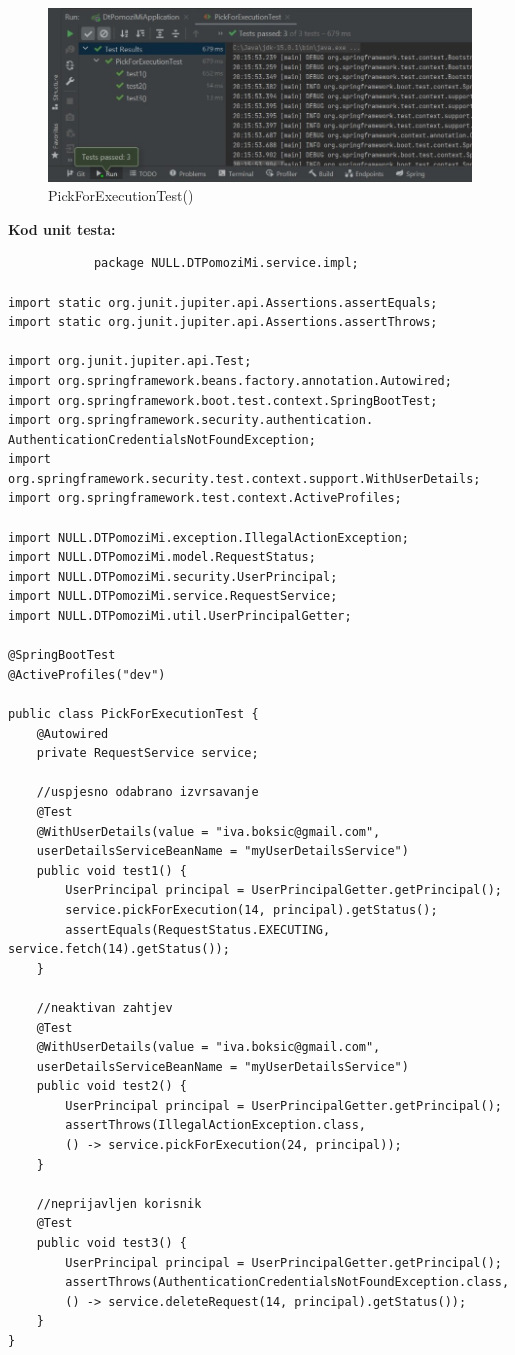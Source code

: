             \begin{figure}[H]
                 \includegraphics[width=\textwidth, height=\textheight, keepaspectratio]{slike/PickForExecutionTest.jpeg}
                \centering
                \caption{PickForExecutionTest()}
            \end{figure}
            
            \noindent \textbf{Kod unit testa: }
            \begin{verbatim}
			package NULL.DTPomoziMi.service.impl;

import static org.junit.jupiter.api.Assertions.assertEquals;
import static org.junit.jupiter.api.Assertions.assertThrows;

import org.junit.jupiter.api.Test;
import org.springframework.beans.factory.annotation.Autowired;
import org.springframework.boot.test.context.SpringBootTest;
import org.springframework.security.authentication.
AuthenticationCredentialsNotFoundException;
import org.springframework.security.test.context.support.WithUserDetails;
import org.springframework.test.context.ActiveProfiles;

import NULL.DTPomoziMi.exception.IllegalActionException;
import NULL.DTPomoziMi.model.RequestStatus;
import NULL.DTPomoziMi.security.UserPrincipal;
import NULL.DTPomoziMi.service.RequestService;
import NULL.DTPomoziMi.util.UserPrincipalGetter;

@SpringBootTest
@ActiveProfiles("dev")

public class PickForExecutionTest {
	@Autowired
	private RequestService service;

	//uspjesno odabrano izvrsavanje
	@Test
	@WithUserDetails(value = "iva.boksic@gmail.com",
	userDetailsServiceBeanName = "myUserDetailsService")
	public void test1() {
		UserPrincipal principal = UserPrincipalGetter.getPrincipal();
		service.pickForExecution(14, principal).getStatus();
		assertEquals(RequestStatus.EXECUTING, service.fetch(14).getStatus());
	}

	//neaktivan zahtjev
	@Test
	@WithUserDetails(value = "iva.boksic@gmail.com",
	userDetailsServiceBeanName = "myUserDetailsService")
	public void test2() {
		UserPrincipal principal = UserPrincipalGetter.getPrincipal();
		assertThrows(IllegalActionException.class, 
		() -> service.pickForExecution(24, principal));
	}

	//neprijavljen korisnik
	@Test
	public void test3() {
		UserPrincipal principal = UserPrincipalGetter.getPrincipal();
		assertThrows(AuthenticationCredentialsNotFoundException.class, 
		() -> service.deleteRequest(14, principal).getStatus());
	}
}
			\end{verbatim}
			
